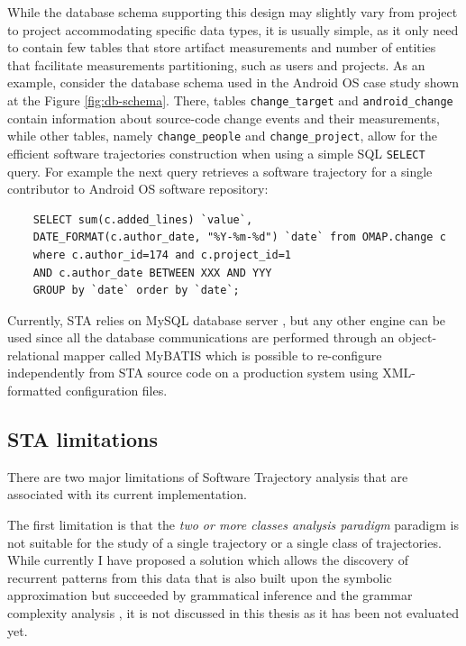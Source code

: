 While the database schema supporting this design may slightly vary from project to project accommodating specific data types, it is usually simple, as it only need to contain few tables that store artifact measurements and number of entities that facilitate measurements partitioning, such as users and projects. As an example, consider the database schema used in the Android OS case study shown at the Figure \ref{fig:db-schema}. There, tables \texttt{change\_target} and \texttt{android\_change} contain information about source-code change events and their measurements, while other tables, namely \texttt{change\_people} and \texttt{change\_project}, allow for the efficient software trajectories construction when using a simple SQL \texttt{SELECT} query. For example the next query retrieves a software trajectory for a single contributor to Android OS software repository: 
\begin{verbatim}
    SELECT sum(c.added_lines) `value`, 
    DATE_FORMAT(c.author_date, "%Y-%m-%d") `date` from OMAP.change c
    where c.author_id=174 and c.project_id=1
    AND c.author_date BETWEEN XXX AND YYY
    GROUP by `date` order by `date`;
\end{verbatim}

Currently, STA relies on MySQL database server \cite{mysql}, but any other engine can be used since all the database communications are performed through an object-relational mapper called MyBATIS \cite{mybatis} which is possible to re-configure independently from STA source code on a production system using XML-formatted configuration files.

\subsection{STA limitations}\label{sta_limitations}
There are two major limitations of Software Trajectory analysis that are associated with its current implementation.

The first limitation is that the \textit{two or more classes analysis paradigm} paradigm is not suitable for the study of a single trajectory or a single class of trajectories. While currently I have proposed a solution which allows the discovery of recurrent patterns from this data that is also built upon the symbolic approximation but succeeded by grammatical inference and the grammar complexity analysis \cite{grammarviz2}, it is not discussed in this thesis as it has been not evaluated yet.

